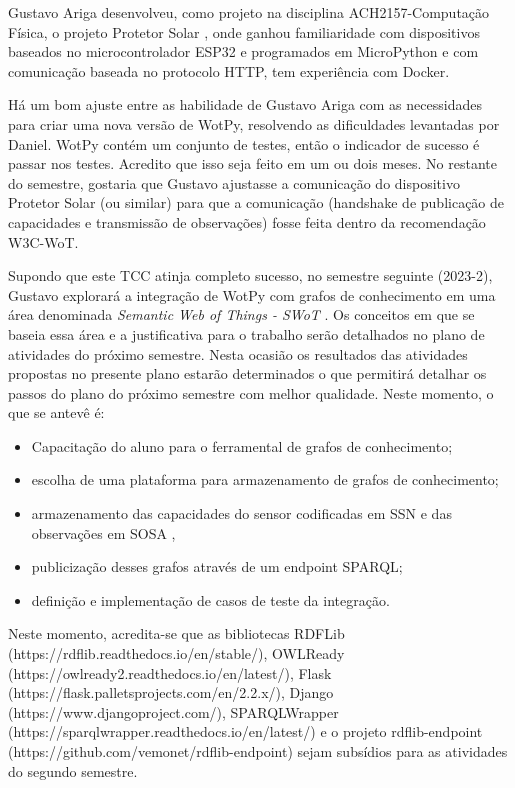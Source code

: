 Gustavo Ariga desenvolveu, como projeto na disciplina ACH2157-Computação Física, o projeto Protetor Solar \cite{ProtetorSolar}, onde ganhou familiaridade com dispositivos baseados no microcontrolador ESP32 e programados em MicroPython e com comunicação baseada no protocolo HTTP, tem experiência com Docker.

Há um bom ajuste entre as habilidade de Gustavo Ariga com as necessidades para criar uma nova versão de WotPy, resolvendo as dificuldades levantadas por Daniel. WotPy contém um conjunto de testes, então o indicador de sucesso é passar nos testes. Acredito que isso seja feito em um ou dois meses. No restante do semestre, gostaria que Gustavo ajustasse a comunicação do dispositivo Protetor Solar (ou similar) para que a comunicação (handshake de publicação de capacidades e transmissão de observações) fosse feita dentro da recomendação W3C-WoT. 

Supondo que este TCC atinja completo sucesso, no semestre seguinte (2023-2), Gustavo explorará a integração de WotPy com grafos de conhecimento em uma área denominada \textit{Semantic Web of Things - SWoT} \cite{Scioscia2009} \cite{Jara2014SWoT}. Os conceitos em que se baseia essa área e a justificativa para o trabalho serão detalhados no plano de atividades do próximo semestre. Nesta ocasião os resultados das atividades propostas no presente plano estarão determinados o que permitirá detalhar os passos do plano do próximo semestre com melhor qualidade. Neste momento, o que se antevê é:

\begin{itemize}
\item {Capacitação do aluno para o ferramental de grafos de conhecimento;}
\item {escolha de uma plataforma para armazenamento de grafos de conhecimento;}
\item {armazenamento das capacidades do sensor codificadas em SSN e das observações em SOSA \cite{JANOWICZ20191}, \cite{Janowicz:17:SSN}}
\item{publicização desses grafos através de um endpoint SPARQL;}
\item{definição e implementação de casos de teste da integração.}
\end{itemize}

Neste momento, acredita-se que as bibliotecas RDFLib (https://rdflib.readthedocs.io/en/stable/), OWLReady (https://owlready2.readthedocs.io/en/latest/), Flask (https://flask.palletsprojects.com/en/2.2.x/), Django (https://www.djangoproject.com/), SPARQLWrapper (https://sparqlwrapper.readthedocs.io/en/latest/) e o projeto rdflib-endpoint (https://github.com/vemonet/rdflib-endpoint) sejam subsídios para as atividades do segundo semestre.

